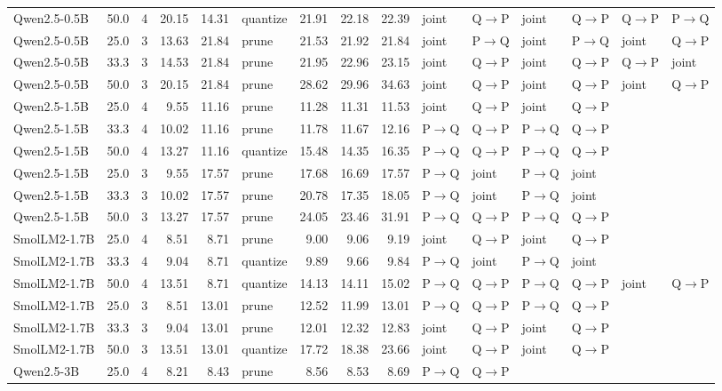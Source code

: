 \documentclass{article}
\begin{document}
\begin{longtable}{lrrrrlrrrllllll}
Qwen2.5-0.5B & 50.0 & 4 & 20.15 & 14.31 & quantize & 21.91 & 22.18 & 22.39 & joint & Q$\to$P & joint & Q$\to$P & Q$\to$P & P$\to$Q \\
Qwen2.5-0.5B & 25.0 & 3 & 13.63 & 21.84 & prune & 21.53 & 21.92 & 21.84 & joint & P$\to$Q & joint & P$\to$Q & joint & Q$\to$P \\
Qwen2.5-0.5B & 33.3 & 3 & 14.53 & 21.84 & prune & 21.95 & 22.96 & 23.15 & joint & Q$\to$P & joint & Q$\to$P & Q$\to$P & joint \\
Qwen2.5-0.5B & 50.0 & 3 & 20.15 & 21.84 & prune & 28.62 & 29.96 & 34.63 & joint & Q$\to$P & joint & Q$\to$P & joint & Q$\to$P \\
Qwen2.5-1.5B & 25.0 & 4 & 9.55 & 11.16 & prune & 11.28 & 11.31 & 11.53 & joint & Q$\to$P & joint & Q$\to$P &  &  \\
Qwen2.5-1.5B & 33.3 & 4 & 10.02 & 11.16 & prune & 11.78 & 11.67 & 12.16 & P$\to$Q & Q$\to$P & P$\to$Q & Q$\to$P &  &  \\
Qwen2.5-1.5B & 50.0 & 4 & 13.27 & 11.16 & quantize & 15.48 & 14.35 & 16.35 & P$\to$Q & Q$\to$P & P$\to$Q & Q$\to$P &  &  \\
Qwen2.5-1.5B & 25.0 & 3 & 9.55 & 17.57 & prune & 17.68 & 16.69 & 17.57 & P$\to$Q & joint & P$\to$Q & joint &  &  \\
Qwen2.5-1.5B & 33.3 & 3 & 10.02 & 17.57 & prune & 20.78 & 17.35 & 18.05 & P$\to$Q & joint & P$\to$Q & joint &  &  \\
Qwen2.5-1.5B & 50.0 & 3 & 13.27 & 17.57 & prune & 24.05 & 23.46 & 31.91 & P$\to$Q & Q$\to$P & P$\to$Q & Q$\to$P &  &  \\
SmolLM2-1.7B & 25.0 & 4 & 8.51 & 8.71 & prune & 9.00 & 9.06 & 9.19 & joint & Q$\to$P & joint & Q$\to$P &  &  \\
SmolLM2-1.7B & 33.3 & 4 & 9.04 & 8.71 & quantize & 9.89 & 9.66 & 9.84 & P$\to$Q & joint & P$\to$Q & joint &  &  \\
SmolLM2-1.7B & 50.0 & 4 & 13.51 & 8.71 & quantize & 14.13 & 14.11 & 15.02 & P$\to$Q & Q$\to$P & P$\to$Q & Q$\to$P & joint & Q$\to$P \\
SmolLM2-1.7B & 25.0 & 3 & 8.51 & 13.01 & prune & 12.52 & 11.99 & 13.01 & P$\to$Q & Q$\to$P & P$\to$Q & Q$\to$P &  &  \\
SmolLM2-1.7B & 33.3 & 3 & 9.04 & 13.01 & prune & 12.01 & 12.32 & 12.83 & joint & Q$\to$P & joint & Q$\to$P &  &  \\
SmolLM2-1.7B & 50.0 & 3 & 13.51 & 13.01 & quantize & 17.72 & 18.38 & 23.66 & joint & Q$\to$P & joint & Q$\to$P &  &  \\
Qwen2.5-3B & 25.0 & 4 & 8.21 & 8.43 & prune & 8.56 & 8.53 & 8.69 & P$\to$Q & Q$\to$P &  &  &  &  \\

\end{longtable}
\end{document}
